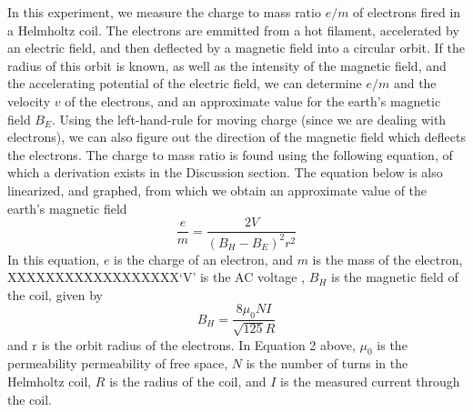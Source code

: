 \documentclass[letterpaper]{article}
\begin{document}
In this experiment, we measure the charge to mass ratio $e/m$ of electrons fired in a
Helmholtz coil.
The electrons are emmitted from a hot filament, accelerated by an electric field, and then deflected
by a magnetic field into a circular orbit. If the radius of this orbit is known,
as well as the intensity of the magnetic field, and the accelerating potential of the
electric field, we can determine $e/m$ and the velocity $v$ of the electrons, and an approximate value for
the earth's magnetic field $B_E$. Using the left-hand-rule for moving charge (since we are
dealing with electrons), we can also figure out the direction of the magnetic field which deflects the electrons.
The charge to mass ratio is found using the following equation, of which a derivation exists in the Discussion section.
The equation below is also linearized, and graphed, from which we obtain an approximate value of the earth's magnetic field
\begin{equation}
  \frac{e}{m} = \frac{2V}{(B_H-B_E)^2r^2}
\end{equation}
In this equation, $e$ is the charge of an electron, and $m$ is the mass of the electron, XXXXXXXXXXXXXXXXXX`V' is the AC voltage
, $B_H$ is the magnetic field of the coil, given by
\begin{equation}
  B_H=\frac{8\mu_0 NI}{ \sqrt{125} R}
\end{equation}
and r is the orbit radius of the electrons. In Equation 2 above, $\mu_0$ is the permeability permeability of free space,
$N$ is the number of turns in the Helmholtz coil, $R$ is the radius of the coil, and $I$ is the measured current through the
coil.

\end{document}
